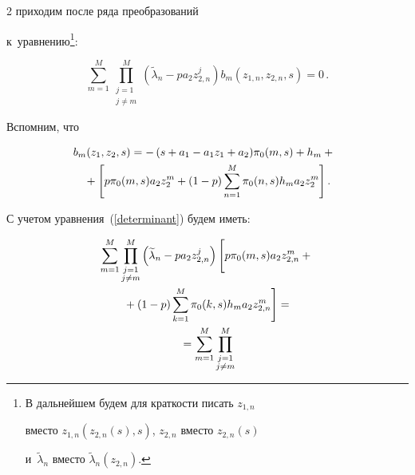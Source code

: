 \begin{multicols}{2}
приходим после ряда преобразований 


к~уравнению\footnote{В дальнейшем будем для краткости писать $z_{1,n}$ 


вместо $z_{1,n}(z_{2,n}(s),s)$, $z_{2,n}$ вместо $z_{2,n}(s)$ 


и~$\widetilde{\lambda}_n$ вместо $\widetilde{\lambda}_n(z_{2,n})$.}:


\begin{equation}


\sum\limits_{m=1}^M


\prod\limits_{\substack{j=1\\j\neq m}}^M(\widetilde{\lambda}_n-


pa_2 z_{2,n}^j)b_m(z_{1,n},z_{2,n},s)=0\,.


\label{findpi2}


\end{equation}


Вспомним, что


\begin{multline*}


\hspace*{-5.5pt}b_m\!\left(z_1,z_2,s\right)=-\left(s+a_1-a_1 z_1+a_2\right)


\!\pi_0(m,s)+h_m+{}\\


{}+\left[p\pi_0(m,s)a_2 z_2^m+(1-p)


\sum\limits_{n=1}^{M}\pi_0(n,s)h_m a_2 z_2^m\right].


\end{multline*}


С учетом уравнения~(\ref{determinant}) будем иметь:


\begin{multline*}


\sum\limits_{m=1}^M\prod\limits_{\substack{j=1\\j\neq m}}^M


\left(\widetilde{\lambda}_n-pa_2 z_{2,n}^j\right)


\left[


\vphantom{\sum\limits_{k=1}^{M}}


p\pi_0(m,s)a_2 z_{2,n}^m+{}\right.\\


\left.{}+(1-p)


\sum\limits_{k=1}^{M}\pi_0(k,s)h_m a_2 z_{2,n}^m\right]={}\\


{}=\sum\limits_{m=1}^M


\prod\limits_{\substack{j=1\\j\neq m}}^M



\end{multline*}
\end{multicols}

